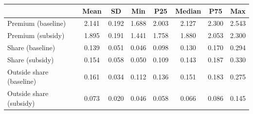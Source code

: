 \begin{tabular}{lccccccc}
\hline
 & Mean & SD & Min & P25 & Median & P75 & Max \\
\hline
Premium (baseline) & 2.141 & 0.192 & 1.688 & 2.003 & 2.127 & 2.300 & 2.543 \\
Premium (subsidy) & 1.895 & 0.191 & 1.441 & 1.758 & 1.880 & 2.053 & 2.300 \\
Share (baseline) & 0.139 & 0.051 & 0.046 & 0.098 & 0.130 & 0.170 & 0.294 \\
Share (subsidy) & 0.154 & 0.058 & 0.050 & 0.109 & 0.143 & 0.187 & 0.330 \\
Outside share (baseline) & 0.161 & 0.034 & 0.112 & 0.136 & 0.151 & 0.183 & 0.275 \\
Outside share (subsidy) & 0.073 & 0.020 & 0.046 & 0.058 & 0.066 & 0.086 & 0.145 \\
\hline
\end{tabular}